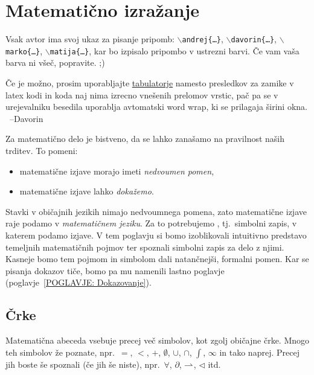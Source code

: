 \chapter{Matematično izražanje}\label{POGLAVJE: Matematično izražanje}


        \alert{Vsak avtor ima svoj ukaz za pisanje pripomb: \textcolor{andrejcolor}{\texttt{$\backslash$andrej\{\ldots\}}}, \textcolor{davorincolor}{\texttt{$\backslash$davorin\{\ldots\}}}, \textcolor{markocolor}{\texttt{$\backslash$marko\{\ldots\}}}, \textcolor{matijacolor}{\texttt{$\backslash$matija\{\ldots\}}}, kar bo izpisalo pripombo v ustrezni barvi. Če vam vaša barva ni všeč, popravite. ;)}


        \alert{Če je možno, prosim uporabljajte \uline{tabulatorje} namesto presledkov za zamike v latex kodi in koda naj nima izrecno vnešenih prelomov vrstic, pač pa se v urejevalniku besedila uporablja avtomatski word wrap, ki se prilagaja širini okna. \ --Davorin}

        Za matematično delo je bistveno, da se lahko zanašamo na pravilnost naših trditev. To pomeni:
        \begin{itemize}
                \item
                        matematične izjave morajo imeti \emph{nedvoumen pomen},
                \item
                        matematične izjave lahko \emph{dokažemo}.
        \end{itemize}

        Stavki v običajnih jezikih nimajo nedvoumnega pomena, zato matematične izjave raje podamo v \emph{matematičnem jeziku}. Za to potrebujemo , tj.~simbolni zapis, v katerem podamo izjave. V tem poglavju si bomo izoblikovali intuitivno predstavo temeljnih matematičnih pojmov ter spoznali simbolni zapis za delo z njimi. Kasneje bomo tem pojmom in simbolom dali natančnejši, formalni pomen. Kar se pisanja dokazov tiče, bomo pa mu namenili lastno poglavje (poglavje~\ref{POGLAVJE: Dokazovanje}).


        \section{Črke}

                Matematična abeceda vsebuje precej več simbolov, kot zgolj običajne črke. Mnogo teh simbolov že poznate, npr.~$=$, $<$, $+$, $\emptyset$, $\cup$, $\cap$, $\int$, $\infty$ in tako naprej. Precej jih boste še spoznali (če jih še niste), npr.~$\forall$, $\partial$, $\mathrel{\rightharpoonup}$, $\lhd$ itd.

